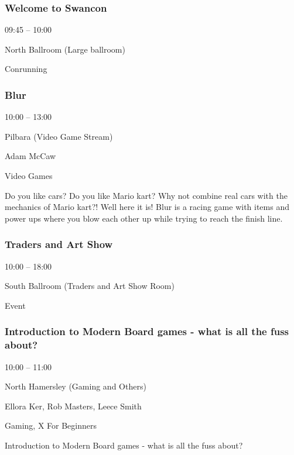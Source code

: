 \documentclass{scrreprt}
\begin{document}
\begin{multicols}{2}
\subsubsection*{Welcome to Swancon}\begin{description}
\setlength{\itemsep}{0pt}
\setlength{\parsep}{0pt}
\setlength{\parskip}{0pt}
\item[Time:]{09:45 -- 10:00}
\item[Venue:]{North Ballroom (Large ballroom)}
\item[Tags:]{Conrunning}\end{description}

\subsubsection*{Blur}\begin{description}
\setlength{\itemsep}{0pt}
\setlength{\parsep}{0pt}
\setlength{\parskip}{0pt}
\item[Time:]{10:00 -- 13:00}
\item[Venue:]{Pilbara (Video Game Stream)}
\item[People:]{Adam McCaw}
\item[Tags:]{Video Games}\end{description}
Do you like cars? Do you like Mario kart? Why not combine real cars with the mechanics of Mario kart?! Well here it is! Blur is a racing game with items and power ups where you blow each other up while trying to reach the finish line.
\subsubsection*{Traders and Art Show}\begin{description}
\setlength{\itemsep}{0pt}
\setlength{\parsep}{0pt}
\setlength{\parskip}{0pt}
\item[Time:]{10:00 -- 18:00}
\item[Venue:]{South Ballroom (Traders and Art Show Room)}
\item[Tags:]{Event}\end{description}

\subsubsection*{Introduction to Modern Board games - what is all the fuss about?}\begin{description}
\setlength{\itemsep}{0pt}
\setlength{\parsep}{0pt}
\setlength{\parskip}{0pt}
\item[Time:]{10:00 -- 11:00}
\item[Venue:]{North Hamersley (Gaming and Others)}
\item[People:]{Ellora Ker, Rob Masters, Leece Smith}
\item[Tags:]{Gaming, X For Beginners}\end{description}
Introduction to Modern Board games - what is all the fuss about?

\end{multicols}
\end{document}

